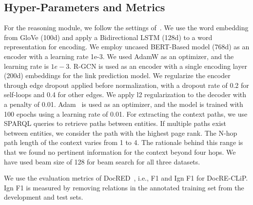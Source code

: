 \documentclass[letterpaper]{article} %
\begin{document}
\subsection{Hyper-Parameters and Metrics}
For the reasoning module, we follow the settings of~\cite{xu-etal-2021-discriminative}. We use the word embedding from GloVe (100d) and apply a Bidirectional LSTM (128d) to a word representation for encoding. 
We employ uncased BERT-Based model (768d) as an encoder with a learning rate 1e-3. We used AdamW as an optimizer, and the learning rate is $1e-3$. 
R-GCN is used as an encoder with a single encoding layer (200d) embeddings for the link prediction model. We regularize the encoder through edge dropout applied before normalization, with a dropout rate of 0.2 for self-loops and 0.4 for other edges. We apply l2 regularization to the decoder with a penalty of 0.01. Adam~\cite{DBLP:journals/corr/KingmaB14} is used as an optimizer, and the model is trained with 100 epochs using a learning rate of 0.01. For extracting the context paths, we use SPARQL queries to retrieve paths between entities. If multiple paths exist between entities, we consider the path with the highest page rank. The N-hop path length of the context varies from 1 to 4. The rationale behind this range is that we found no pertinent information for the context beyond four hops. We have used beam size of 128 for beam search for all three datasets.

We use the evaluation metrics of DocRED~\cite{yao-etal-2019-docred}, i.e., F1 and Ign F1 for DocRE-CLiP. Ign F1 is measured by removing relations in the annotated training set from the development and test sets. 

    
\end{document}

